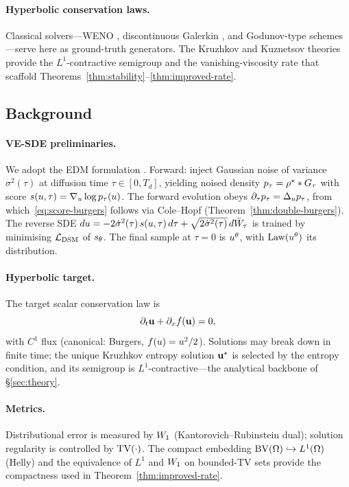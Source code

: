 \paragraph{Hyperbolic conservation laws.}
Classical solvers---{WENO} \citep{shu1999weno}, discontinuous Galerkin \citep{cockburn2001dg}, and Godunov-type schemes---serve here as ground-truth generators. The Kruzhkov \citep{kruzhkov1970} and Kuznetsov \citep{kuznetsov1976} theories provide the $L^{1}$-contractive semigroup and the vanishing-viscosity rate that scaffold Theorems~\ref{thm:stability}--\ref{thm:improved-rate}.

\subsection{Background}
\label{sec:background}

\paragraph{{VE-SDE} preliminaries.}
We adopt the {EDM} formulation \citep{karras2022edm}. Forward: inject Gaussian noise of variance $\sigma^{2}(\tau)$ at diffusion time $\tau\in[0,T_{d}]$, yielding noised density $p_{\tau}=\rho^{\star}\ast G_{\tau}$ with score $s(u,\tau)=\nabla_{u}\log p_{\tau}(u)$. The forward evolution obeys $\partial_{\tau}p_{\tau}=\Delta_{u}p_{\tau}$, from which~\eqref{eq:score-burgers} follows via Cole--Hopf (Theorem~\ref{thm:double-burgers}). The reverse {SDE} $du = -2\dot\sigma^{2}(\tau)\,s(u,\tau)\,d\tau + \sqrt{2\dot\sigma^{2}(\tau)}\,d\bar W_{\tau}$ is trained by minimising $\mathcal{L}_{\mathrm{DSM}}$ of $s_{\theta}$. The final sample at $\tau=0$ is $u^{\theta}$, with $\mathrm{Law}(u^{\theta})$ its distribution.

\paragraph{Hyperbolic target.}
The target scalar conservation law is
\begin{equation}
\partial_{t}\mathbf{u}+\partial_{x}f(\mathbf{u})=0, \label{eq:scalar-law}
\end{equation}
with $C^{1}$ flux (canonical: Burgers, $f(u)=u^{2}/2$). Solutions may break down in finite time; the unique Kruzhkov entropy solution $\mathbf{u}^{\star}$ \citep{kruzhkov1970} is selected by the entropy condition, and its semigroup is $L^{1}$-contractive---the analytical backbone of \S\ref{sec:theory}.

\paragraph{Metrics.}
Distributional error is measured by $W_{1}$ (Kantorovich--Rubinstein dual); solution regularity is controlled by $\mathrm{TV}(\cdot)$. The compact embedding $\mathrm{BV}(\Omega)\hookrightarrow L^{1}(\Omega)$ (Helly) and the equivalence of $L^{1}$ and $W_{1}$ on bounded-{TV} sets provide the compactness used in Theorem~\ref{thm:improved-rate}.
